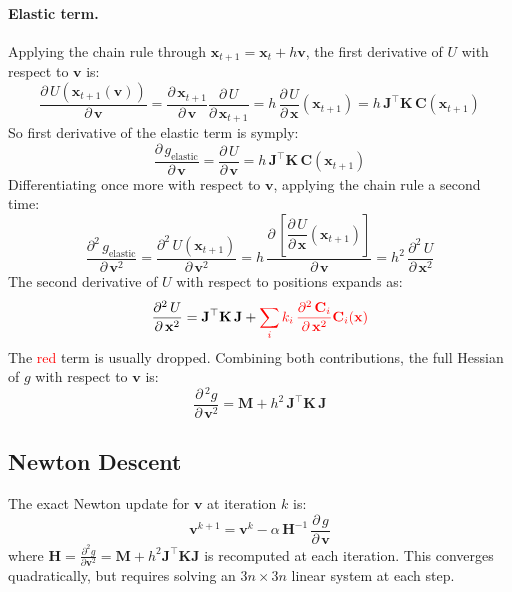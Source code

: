 \documentclass{article}
\newcommand{\pd}[2]{\dfrac{\partial\, #1}{\partial\, #2}}
\newcommand{\pdc}[2]{\frac{\partial #1}{\partial #2}}
\newcommand{\pdv}[2]{\dfrac{\partial^2\, #1}{\partial\, #2^2}}
\newcommand{\drop}[1]{\textcolor{red}{#1}}
\newcommand{\red}[1]{\textcolor{red}{#1}}
\begin{document}
\begin{derivation}
\paragraph{Elastic term.}
Applying the chain rule through $\mathbf{x}_{t+1} = \mathbf{x}_t + h\mathbf{v}$, 
the first derivative of $U$ with respect to $\mathbf{v}$ is:
%
\begin{equation*} 
    \pd{U(\mathbf{x}_{t+1}(\mathbf{v}))}{\mathbf{v}} 
    = 
    \pd{\mathbf{x}_{t+1}}{\mathbf{v}} \pd{U}{\mathbf{x}_{t+1}} 
    = 
    h\, \pd{U}{\mathbf{x}}(\mathbf{x}_{t+1}) 
    = 
    h\, \mathbf{J}^\top \mathbf{K}\, \mathbf{C}(\mathbf{x}_{t+1})
\end{equation*}
%
So first derivative of the elastic term is symply:
\begin{equation*} 
\pd{g_{\text{elastic}}}{\mathbf{v}} = 
    \pd{U}{\mathbf{v}} =
    h\, \mathbf{J}^\top \mathbf{K}\, \mathbf{C}(\mathbf{x}_{t+1})
\end{equation*}
%
Differentiating once more with respect to $\mathbf{v}$, applying the chain rule a second time:
%
\begin{equation*}
    \pdv{g_{\text{elastic}}}{\mathbf{v}} = 
    \pdv{U(\mathbf{x}_{t+1})}{\mathbf{v}} = 
    h\, \pd{\left[\pd{U}{\mathbf{x}}(\mathbf{x}_{t+1})\right]}{\mathbf{v}} = 
    h^2\, \pdv{U}{\mathbf{x}}
\end{equation*}
%
The second derivative of $U$ with respect to positions expands as:
%
\begin{equation*}
    \pdv{U}{\mathbf{x}} = 
    \mathbf{J}^\top \mathbf{K}\, \mathbf{J} + 
    \drop{\sum_{i} k_i\, \pdv{\mathbf{C}_i}{\mathbf{x}}\mathbf{C}_i(\mathbf{x})}
\end{equation*}
%
The \red{red} term is usually dropped. Combining both contributions, the full Hessian of $g$ with respect to $\mathbf{v}$ is:
%
\begin{equation*}
    \pd{^2 g}{\mathbf{v}^2} = \mathbf{M} + h^2\, \mathbf{J}^\top \mathbf{K}\, \mathbf{J}
\end{equation*}
\end{derivation}

\subsection{Newton Descent}
\label{sec:newton_method}

The exact Newton update for $\mathbf{v}$ at iteration $k$ is:
\begin{equation}
    \mathbf{v}^{k+1} = \mathbf{v}^k - \alpha\,\mathbf{H}^{-1}\,\pd{g}{\mathbf{v}}
\end{equation}
where $\mathbf{H} = \pdc{^2g}{\mathbf{v}^2} = \mathbf{M} + h^2\mathbf{J}^\top\mathbf{K}\mathbf{J}$ is recomputed at each iteration. This converges quadratically, but requires solving an $3n \times 3n$ linear system at each step.
\end{document}
